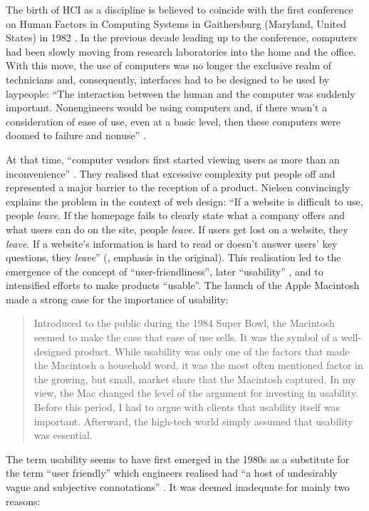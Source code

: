 The birth of HCI as a discipline is believed to coincide with the first conference on Human Factors in Computing Systems in Gaithersburg (Maryland, United States) in 1982 \citep[1]{lazar2017research}. In the previous decade leading up to the conference, computers had been slowly moving from research laboratories into the home and the office. With this move, the use of computers was no longer the exclusive realm of technicians and, consequently, interfaces had to be designed to be used by laypeople: ``The interaction between the human and the computer was suddenly important. Nonengineers would be using computers and, if there wasn’t a consideration of ease of use, even at a basic level, then these computers were doomed to failure and nonuse'' \citep[2]{lazar2017research}.

At that time, ``computer vendors first started viewing users as more than an inconvenience'' \citep[4]{nielsen2010}. They realised that excessive complexity put people off and represented a major barrier to the reception of a product. Nielsen convincingly explains the problem in the context of web design: ``If a website is difficult to use, people \textit{leave}. If the homepage fails to clearly state what a company offers and what users can do on the site, people \textit{leave}. If users get lost on a website, they \textit{leave}. If a website's information is hard to read or doesn't answer users' key questions, they \textit{leave}'' (\citealt{nielsen2012}, emphasis in the original). This realisation led to the emergence of the concept of “user-friendliness”, later “usability” \citep{bevana1991usability,nielsen2010}, and to intensified efforts to make products “usable”. The launch of the Apple Macintosh made a strong case for the importance of usability:
\begin{quote}
    Introduced to the public during the 1984 Super Bowl, the Macintosh seemed to make the case that ease of use sells. It was the symbol of a well-designed product. While usability was only one of the factors that made the Macintosh a household word, it was the most often mentioned factor in the growing, but small, market share that the Macintosh captured. In my view, the Mac changed the level of the argument for investing in usability. Before this period, I had to argue with clients that usability itself was important. Afterward, the high-tech world simply assumed that usability was essential. \citep[56]{dumas2007great}
\end{quote}
The term usability seems to have first emerged in the 1980s as a substitute for the term ``user friendly'' which engineers realised had ``a host of undesirably vague and subjective connotations'' \citep{bevana1991usability}. It was deemed inadequate for mainly two reasons:
